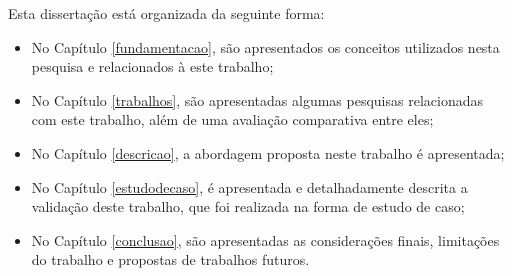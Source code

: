 Esta dissertação está organizada da seguinte forma:

\begin{itemize}
  \item No Capítulo \ref{fundamentacao}, são apresentados os conceitos utilizados nesta pesquisa e relacionados à este trabalho;
  \item No Capítulo \ref{trabalhos}, são apresentadas algumas pesquisas relacionadas com este trabalho, além de uma avaliação comparativa entre eles;
  \item No Capítulo \ref{descricao}, a abordagem proposta neste trabalho é apresentada;
  \item No Capítulo \ref{estudodecaso}, é apresentada e detalhadamente descrita a validação deste trabalho, que foi realizada na forma de estudo de caso;
  \item No Capítulo \ref{conclusao}, são apresentadas as considerações finais, limitações do trabalho e propostas de trabalhos futuros.
\end{itemize}
